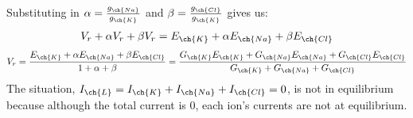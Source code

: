 \documentclass[11pt]{article}
\begin{document}
\begin{enumerate}[label=\arabic*.]
\begin{enumerate}[label=(\alph*)]
Substituting in $\alpha = \frac{g_{\ch{Na}}} {g_{\ch{K}}}$ and $\beta = \frac {g_{\ch{Cl}}} {g_{\ch{K}}}$ gives us:
\begin{align*}
V_r + \alpha V_r + \beta V_r = E_{\ch{K}} + \alpha E_{\ch{Na}} + \beta E_{\ch{Cl}}
\end{align*}
\begin{align*}
V_r = \frac{E_{\ch{K}} + \alpha E_{\ch{Na}} + \beta E_{\ch{Cl}}} {1 + \alpha + \beta} = \frac{G_{\ch{K}} E_{\ch{K}} + G_{\ch{Na}} E_{\ch{Na}} + G_{\ch{Cl}} E_{\ch{Cl}}} {G_{\ch{K}} + G_{\ch{Na}} + G_{\ch{Cl}}}
\end{align*}
The situation, $I_{\ch{L}} = I_{\ch{K}} + I_{\ch{Na}} + I_{\ch{Cl}} = 0$, is not in equilibrium because although the total current is $0$, each ion's currents are not at equilibrium.




\end{enumerate}
\end{enumerate}
\end{document}
